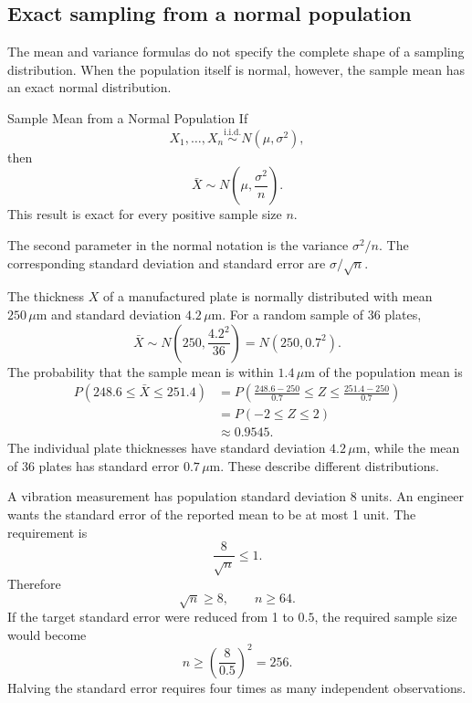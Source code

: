 \subsection{Exact sampling from a normal population}

The mean and variance formulas do not specify the complete shape of a sampling distribution. When the population itself is normal, however, the sample mean has an exact normal distribution.

\newpage

\begin{theorem}{Sample Mean from a Normal Population}
If
\[
    X_1,\ldots,X_n \overset{\mathrm{i.i.d.}}{\sim} N(\mu,\sigma^2),
\]
then
\[
    \bar X\sim N\!\left(\mu,\frac{\sigma^2}{n}\right).
\]
This result is exact for every positive sample size $n$.
\end{theorem}

The second parameter in the normal notation is the variance $\sigma^2/n$. The corresponding standard deviation and standard error are $\sigma/\sqrt n$.

\begin{example}\par
The thickness $X$ of a manufactured plate is normally distributed with mean $250\,\mu\mathrm{m}$ and standard deviation $4.2\,\mu\mathrm{m}$. For a random sample of 36 plates,
\[
    \bar X\sim N\!\left(250,\frac{4.2^2}{36}\right)
      =N(250,0.7^2).
\]
The probability that the sample mean is within $1.4\,\mu\mathrm{m}$ of the population mean is
\[
\begin{aligned}
P(248.6\leq\bar X\leq251.4)
  &=P\!\left(\frac{248.6-250}{0.7}
       \leq Z\leq
       \frac{251.4-250}{0.7}\right)\\
  &=P(-2\leq Z\leq2)\\
  &\approx0.9545.
\end{aligned}
\]
The individual plate thicknesses have standard deviation $4.2\,\mu\mathrm{m}$, while the mean of 36 plates has standard error $0.7\,\mu\mathrm{m}$. These describe different distributions.
\end{example}

\begin{example}\par
A vibration measurement has population standard deviation $8$ units. An engineer wants the standard error of the reported mean to be at most 1 unit. The requirement is
\[
    \frac{8}{\sqrt n}\leq1.
\]
Therefore
\[
    \sqrt n\geq8,
    \qquad
    n\geq64.
\]
If the target standard error were reduced from 1 to $0.5$, the required sample size would become
\[
    n\geq\left(\frac{8}{0.5}\right)^2=256.
\]
Halving the standard error requires four times as many independent observations.
\end{example}

